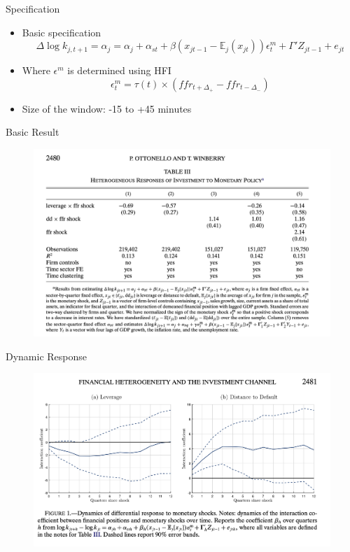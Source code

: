\documentclass[english,xcolor=svgnames,aspectratio=169]{beamer}
\begin{document}
\begin{frame}{Specification}
\begin{itemize}
\item Basic specification
\[\Delta \log k_{j,t+1} = \alpha_j  = \alpha_j + \alpha_{st}  + \beta(x_{jt-1} - \mathbb{E}_j (x_{jt})) \epsilon^m_t + \Gamma' Z_{jt-1} + e_{jt}  \]
\item Where $\epsilon^m$ is determined using HFI
\[\epsilon^m_t = \tau(t) \times(ffr_{t+\Delta_+} - ffr_{t-\Delta_-})\]
\item Size of the window: -15 to +45 minutes
\end{itemize}
\end{frame}


\begin{frame}{Basic Result}
\begin{figure}
\includegraphics[scale=0.3]{figures/ow_1}
\end{figure}
\end{frame}


\begin{frame}{Dynamic Response}
\begin{figure}
\includegraphics[scale=0.35]{figures/ow_2}
\end{figure}
\end{frame}
\end{document}
